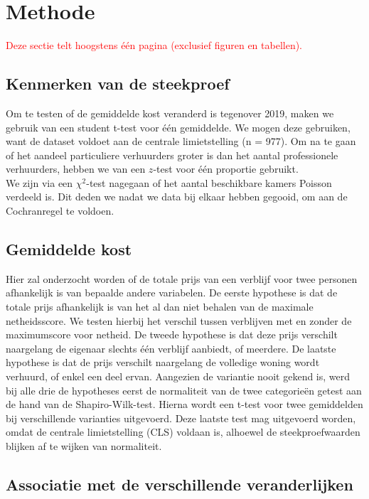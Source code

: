 \documentclass[a4paper]{kulakarticle}
\newcommand{\rood}[1]{\textcolor{red}{#1}}
\begin{document}
	\section{Methode}
	\rood{Deze sectie telt hoogstens één pagina (exclusief figuren en tabellen).}
	\subsection{Kenmerken van de steekproef}
Om te testen of de gemiddelde kost veranderd is tegenover 2019, maken we gebruik van een student t-test voor één gemiddelde. We mogen deze gebruiken, want de dataset voldoet aan de centrale limietstelling (n = 977). Om na te gaan of het aandeel particuliere verhuurders groter is dan het aantal professionele verhuurders, hebben we van een $z$-test voor één proportie gebruikt.\\
 
 We zijn via een $\chi ^2$-test nagegaan of het aantal beschikbare kamers Poisson verdeeld is. Dit deden we nadat we data bij elkaar hebben gegooid, om aan de Cochranregel te voldoen.
	
	\subsection{Gemiddelde kost}
	
	Hier zal onderzocht worden of de totale prijs van een verblijf voor twee personen afhankelijk is van bepaalde andere variabelen.
	De eerste hypothese is dat de totale prijs afhankelijk is van het al dan niet behalen van de maximale netheidsscore. We testen hierbij het verschil tussen verblijven met en zonder de maximumscore voor netheid.
	De tweede hypothese is dat deze prijs verschilt naargelang de eigenaar slechts één verblijf aanbiedt, of meerdere.
	De laatste hypothese is dat de prijs verschilt naargelang de volledige woning wordt verhuurd, of enkel een deel ervan.
	Aangezien de variantie nooit gekend is, werd bij alle drie de hypotheses eerst de normaliteit van de twee categorieën getest aan de hand van de Shapiro-Wilk-test. Hierna wordt een t-test voor twee gemiddelden bij verschillende varianties uitgevoerd. Deze laatste test mag uitgevoerd worden, omdat de centrale limietstelling (CLS) voldaan is, alhoewel de steekproefwaarden blijken af te wijken van normaliteit.

	\subsection{Associatie met de verschillende veranderlijken}
	
\end{document}
